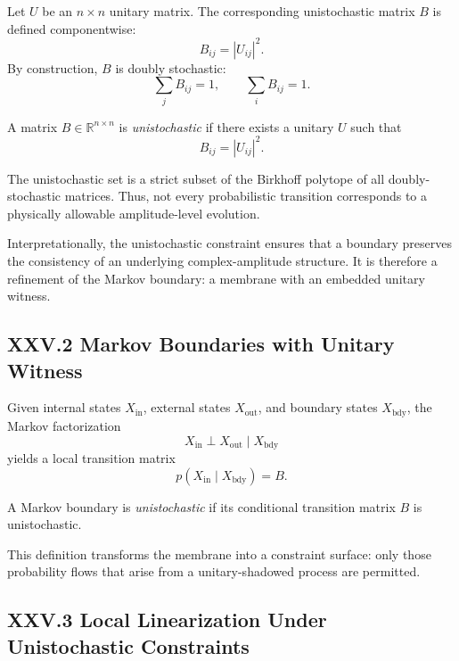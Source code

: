 \documentclass[12pt,letterpaper]{article}
\begin{document}
Let $U$ be an $n \times n$ unitary matrix. The corresponding unistochastic matrix $B$ is defined componentwise:
\[
B_{ij} = |U_{ij}|^2.
\]
By construction, $B$ is doubly stochastic:
\[
\sum_j B_{ij} = 1, \qquad \sum_i B_{ij} = 1.
\]

\begin{definition}
A matrix $B \in \mathbb{R}^{n \times n}$ is \emph{unistochastic} if there exists a unitary $U$ such that  
\[
B_{ij} = |U_{ij}|^2.
\]
\end{definition}

The unistochastic set is a strict subset of the Birkhoff polytope of all doubly-stochastic matrices. Thus, not every probabilistic transition corresponds to a physically allowable amplitude-level evolution.

Interpretationally, the unistochastic constraint ensures that a boundary preserves the consistency of an underlying complex-amplitude structure. It is therefore a refinement of the Markov boundary: a membrane with an embedded unitary witness.

\subsection{XXV.2 Markov Boundaries with Unitary Witness}

Given internal states $X_{\text{in}}$, external states $X_{\text{out}}$, and boundary states $X_{\text{bdy}}$, the Markov factorization
\[
X_{\text{in}} \perp X_{\text{out}} \mid X_{\text{bdy}}
\]
yields a local transition matrix  
\[
p(X_{\text{in}} \mid X_{\text{bdy}}) = B.
\]

\begin{definition}
A Markov boundary is \emph{unistochastic} if its conditional transition matrix $B$ is unistochastic.
\end{definition}

This definition transforms the membrane into a constraint surface: only those probability flows that arise from a unitary-shadowed process are permitted.

\subsection{XXV.3 Local Linearization Under Unistochastic Constraints}
\end{document}
